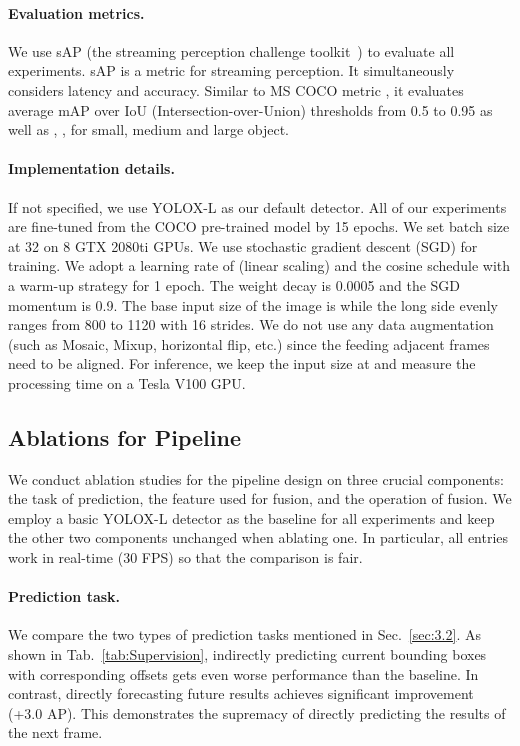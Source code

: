 \documentclass[10pt,twocolumn,letterpaper]{article}
\begin{document}
\paragraph{Evaluation metrics.} We use sAP \cite{streamer} (the streaming perception challenge toolkit~\cite{sAP}) to evaluate all experiments. sAP is a metric for streaming perception. It simultaneously considers latency and accuracy. Similar to MS COCO metric \cite{coco}, it evaluates average mAP over IoU (Intersection-over-Union) thresholds from 0.5 to 0.95 as well as , ,  for small, medium and large object.

\paragraph{Implementation details.} If not specified, we use YOLOX-L \cite{yolox} as our default detector. All of our experiments are fine-tuned from the COCO pre-trained model by 15 epochs. We set batch size at 32 on 8 GTX 2080ti GPUs. We use stochastic gradient descent (SGD) for training. We adopt a learning rate of  (linear scaling\cite{linear}) and the cosine schedule with a warm-up strategy for 1 epoch. The weight decay is 0.0005 and the SGD momentum is 0.9. The base input size of the image is  while the long side evenly ranges from 800 to 1120 with 16 strides. We do not use any data augmentation (such as Mosaic\cite{yolo5}, Mixup\cite{mixup}, horizontal flip, etc.) since the feeding adjacent frames need to be aligned. For inference, we keep the input size at  and measure the processing time on a Tesla V100 GPU. 


\subsection{Ablations for Pipeline}
We conduct ablation studies for the pipeline design on three crucial components: the task of prediction, the feature used for fusion, and the operation of fusion. We employ a basic YOLOX-L detector as the baseline for all experiments and keep the other two components unchanged when ablating one. In particular, all entries work in real-time (30 FPS) so that the comparison is fair.
\paragraph{Prediction task.}
\label{exp:pred}
We compare the two types of prediction tasks mentioned in Sec.~\ref{sec:3.2}. 
As shown in Tab.~\ref{tab:Supervision}, indirectly predicting current bounding boxes with corresponding offsets gets even worse performance than the baseline. In contrast, directly forecasting future results achieves significant improvement (+3.0 AP). This demonstrates the supremacy of directly predicting the results of the next frame.  
\end{document}
